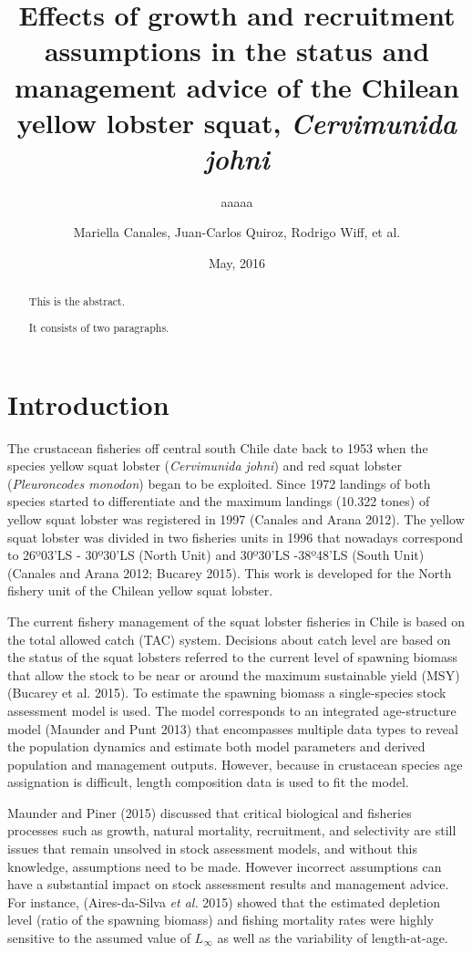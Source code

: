 \documentclass[11pt,letter,]{article}
\title{Effects of growth and recruitment assumptions in the status and
management advice of the Chilean yellow lobster squat, \emph{Cervimunida
johni}}
\subtitle{aaaaa}
\author{Mariella Canales, Juan-Carlos Quiroz, Rodrigo Wiff, et al.}
\date{May, 2016}
\begin{document}
\maketitle
\begin{abstract}
This is the abstract.

It consists of two paragraphs.
\end{abstract}

\section{Introduction}\label{introduction}

The crustacean fisheries off central south Chile date back to 1953 when
the species yellow squat lobster (\emph{Cervimunida johni}) and red
squat lobster (\emph{Pleuroncodes monodon}) began to be exploited. Since
1972 landings of both species started to differentiate and the maximum
landings (10.322 tones) of yellow squat lobster was registered in 1997
(Canales and Arana 2012). The yellow squat lobster was divided in two
fisheries units in 1996 that nowadays correspond to 26º03'LS - 30º30'LS
(North Unit) and 30º30'LS -38º48'LS (South Unit) (Canales and Arana
2012; Bucarey 2015). This work is developed for the North fishery unit
of the Chilean yellow squat lobster.

The current fishery management of the squat lobster fisheries in Chile
is based on the total allowed catch (TAC) system. Decisions about catch
level are based on the status of the squat lobsters referred to the
current level of spawning biomass that allow the stock to be near or
around the maximum sustainable yield (MSY) (Bucarey et al. 2015). To
estimate the spawning biomass a single-species stock assessment model is
used. The model corresponds to an integrated age-structure model
(Maunder and Punt 2013) that encompasses multiple data types to reveal
the population dynamics and estimate both model parameters and derived
population and management outputs. However, because in crustacean
species age assignation is difficult, length composition data is used to
fit the model.

Maunder and Piner (2015) discussed that critical biological and
fisheries processes such as growth, natural mortality, recruitment, and
selectivity are still issues that remain unsolved in stock assessment
models, and without this knowledge, assumptions need to be made. However
incorrect assumptions can have a substantial impact on stock assessment
results and management advice. For instance, (Aires-da-Silva \emph{et
al.} 2015) showed that the estimated depletion level (ratio of the
spawning biomass) and fishing mortality rates were highly sensitive to
the assumed value of \(L_{\infty}\) as well as the variability of
length-at-age.
\end{document}
